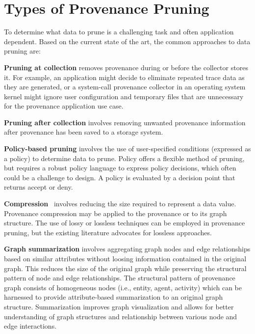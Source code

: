  

\section{Types of Provenance Pruning} 
To determine what data to prune is a challenging task and often application dependent.  %
Based on the current state of the art, the common approaches to data pruning are:
 
\textbf{Pruning at collection} removes provenance during or before the collector stores it. For example, an application might decide to eliminate repeated trace data as they are generated, or a system-call provenance collector in an operating system kernel might ignore user configuration and temporary files that are unnecessary for the provenance application use case.

\textbf{Pruning after collection}  involves removing unwanted provenance information after provenance has been saved to a storage system. %

\textbf{Policy-based pruning} \cite{Bates:2015:TOY:2814579.2814586} involves the use of user-specified conditions (expressed as a policy) to determine data to prune. Policy offers a flexible method of pruning, but requires a robust policy language to express policy decisions, which often could be a challenge to design. A policy is evaluated by a decision point  that returns accept or deny. %


\textbf{Compression}~\cite{xie11-tapp,hussain_secure_2014, 7038199} involves reducing the size required to represent a data value. Provenance compression may be applied to the provenance or to its graph structure. The use of lossy or lossless techniques can be employed in provenance pruning, but the existing literature advocates for lossless approaches.

\textbf{Graph summarization} involves aggregating graph nodes and edge relationships based on similar attributes without loosing information contained in the original graph. This reduces the size of the original graph while preserving the structural pattern of node and edge relationships. The structural pattern of provenance graph consists of homogeneous nodes (i.e., entity, agent, activity) which can be harnessed to provide attribute-based summarization to an original graph structure. Summarization improves graph visualization and allows for better understanding of graph structures and relationship between various node and edge interactions.

